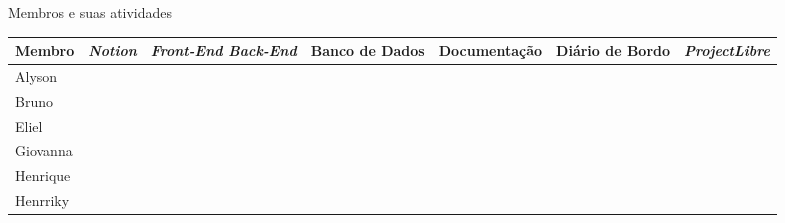 \begin{quadro}[h]
	\setlength{\tabcolsep}{2pt}
	\begin{center}
		\caption{\label{quad:membros-atividades}Membros e suas atividades}
		\begin{tabular}{|l|c|m{2.5cm}|m{2cm}|c|m{2cm}|c|}
			\hline
			\textbf{Membro} & \textbf{\emph{Notion}} & \centering\textbf{\textit{Front-End Back-End}} & \centering\textbf{Banco de Dados} & \textbf{Documentação} & \centering\textbf{Diário de Bordo} & \textbf{\emph{ProjectLibre}}\\
			\hline
			Alyson & \checkmark & \centering\checkmark & \centering\checkmark & \checkmark & \centering\checkmark & \checkmark \\
			\hline
			Bruno & \checkmark & \centering\checkmark & \centering\checkmark & \checkmark & & \checkmark\\
			\hline
			Eliel & \checkmark & \centering\checkmark & \centering\checkmark & \checkmark & & \checkmark\\
			\hline
			Giovanna & \checkmark &  & \centering\checkmark & \checkmark & \centering\checkmark & \checkmark\\
			\hline
			Henrique & \checkmark & \centering\checkmark & \centering\checkmark & \checkmark & & \\
			\hline
			Henrriky & \checkmark & \centering\checkmark & \centering\checkmark & \checkmark & & \\
			\hline
		\end{tabular}
	\end{center}
\end{quadro}